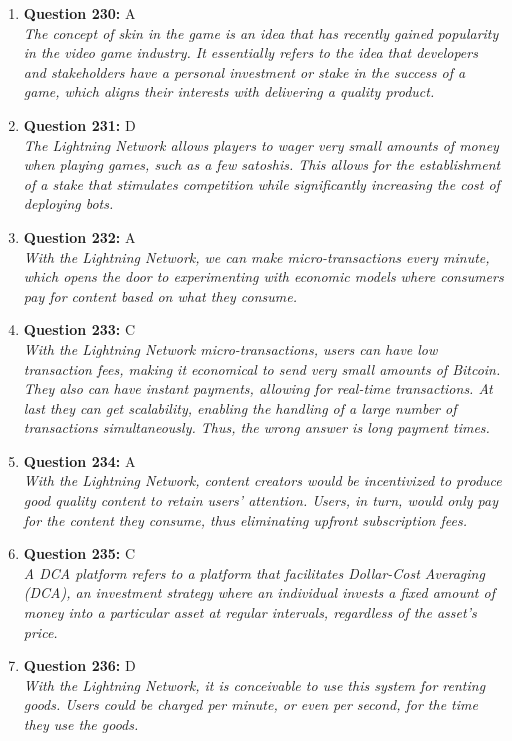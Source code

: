 \documentclass[12pt,a4paper]{article}
\begin{document}
\begin{enumerate}
\item \textbf{Question 230:} A
\\ \textit{The concept of skin in the game is an idea that has recently gained popularity in the video game industry. It essentially refers to the idea that developers and stakeholders have a personal investment or stake in the success of a game, which aligns their interests with delivering a quality product.}

\item \textbf{Question 231:} D
\\ \textit{The Lightning Network allows players to wager very small amounts of money when playing games, such as a few satoshis. This allows for the establishment of a stake that stimulates competition while significantly increasing the cost of deploying bots.}

\item \textbf{Question 232:} A
\\ \textit{With the Lightning Network, we can make micro-transactions every minute, which opens the door to experimenting with economic models where consumers pay for content based on what they consume.}

\item \textbf{Question 233:} C
\\ \textit{With the Lightning Network micro-transactions, users can have low transaction fees, making it economical to send very small amounts of Bitcoin. They also can have instant payments, allowing for real-time transactions. At last they can get scalability, enabling the handling of a large number of transactions simultaneously. Thus, the wrong answer is long payment times.}

\item \textbf{Question 234:} A
\\ \textit{With the Lightning Network, content creators would be incentivized to produce good quality content to retain users' attention. Users, in turn, would only pay for the content they consume, thus eliminating upfront subscription fees.}

\item \textbf{Question 235:} C
\\ \textit{A DCA platform refers to a platform that facilitates Dollar-Cost Averaging (DCA), an investment strategy where an individual invests a fixed amount of money into a particular asset at regular intervals, regardless of the asset's price.}

\item \textbf{Question 236:} D
\\ \textit{With the Lightning Network, it is conceivable to use this system for renting goods. Users could be charged per minute, or even per second, for the time they use the goods.}


\end{enumerate}
\end{document}
